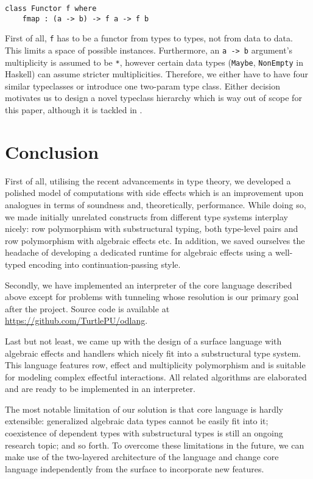 \documentclass[a4paper,14pt]{extreport}
\begin{document}
\begin{verbatim}
class Functor f where
    fmap : (a -> b) -> f a -> f b
\end{verbatim}

First of all, \verb|f| has to be a functor from types to types, not from data to
data. This limits a space of possible instances. Furthermore, an \verb|a -> b|
argument's multiplicity is assumed to be \verb|*|, however certain data types
(\verb|Maybe|, \verb|NonEmpty| in Haskell) can assume stricter multiplicities.
Therefore, we either have to have four similar typeclasses or introduce one
two-param type class. Either decision motivates us to design a novel typeclass
hierarchy which is way out of scope for this paper, although it is tackled in
\cite{linear-base}.

\chapter{Conclusion}

First of all, utilising the recent advancements in type theory, we developed a
polished model of computations with side effects which is an improvement upon
analogues in terms of soundness and, theoretically, performance. While doing so,
we made initially unrelated constructs from different type systems interplay
nicely: row polymorphism with substructural typing, both type-level pairs and
row polymorphism with algebraic effects etc. In addition, we saved ourselves the
headache of developing a dedicated runtime for algebraic effects using a
well-typed encoding into continuation-passing style.

Secondly, we have implemented an interpreter of the core language described
above except for problems with tunneling whose resolution is our primary
goal after the project. Source code is available at
\url{https://github.com/TurtlePU/odlang}.

Last but not least, we came up with the design of a surface language
with algebraic effects and handlers which nicely fit into a substructural type
system. This language features row, effect and multiplicity polymorphism and is
suitable for modeling complex effectful interactions. All related algorithms are
elaborated and are ready to be implemented in an interpreter.

The most notable limitation of our solution is that core language is hardly
extensible: generalized algebraic data types cannot be easily fit into it;
coexistence of dependent types with substructural types is still an ongoing
research topic; and so forth. To overcome these limitations in the future, we
can make use of the two-layered architecture of the language and change core
language independently from the surface to incorporate new features.
\end{document}
